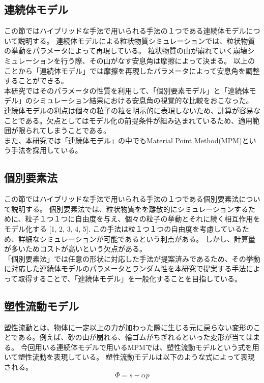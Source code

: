 \documentclass[12pt]{ltjsarticle}
\begin{document}
\subsection{連続体モデル}
この節ではハイブリッドな手法で用いられる手法の１つである連続体モデルについて説明する。
連続体モデルによる粒状物質シミュレーションでは、粒状物質の挙動をパラメータによって再現している。
粒状物質の山が崩れていく崩壊シミュレーションを行う際、その山がなす安息角は摩擦によって決まる。
以上のことから「連続体モデル」では摩擦を再現したパラメータによって安息角を調整することができる。\\
本研究ではそのパラメータの性質を利用して、「個別要素モデル」と「連続体モデル」のシミュレーション結果における安息角の視覚的な比較をおこなった。
連続体モデルの利点は個々の粒子の粒を明示的に表現しないため、計算が容易なことである。欠点としてはモデル化の前提条件が組み込まれているため、適用範囲が限られてしまうことである。\\
また、本研究では「連続体モデル」の中でもMaterial Point Method(MPM)という手法を採用している。

\subsection{個別要素法}
この節ではハイブリッドな手法で用いられる手法の１つである個別要素法について説明する。
個別要素法では、粒状物質をを離散的にシミュレーションするために、粒子１つ１つに自由度を与え、個々の粒子の挙動とそれに続く相互作用をモデル化する [1, 2, 3, 4, 5].
この手法は粒１つ１つの自由度を考慮しているため、詳細なシミュレーションが可能であるという利点がある。
しかし、計算量が多いためコストが高いという欠点がある。\\
「個別要素法」では任意の形状に対応した手法が提案済みであるため、その挙動に対応した連続体モデルのパラメータとランダム性を本研究で提案する手法によって取得することで、「連続体モデル」を一般化することを目指している。




\subsection{塑性流動モデル}
塑性流動とは、物体に一定以上の力が加わった際に生じる元に戻らない変形のことである。例えば、砂の山が崩れる、輪ゴムがちぎれるといった変形が当てはまる。
今回用いる連続体モデルで用いるMPMでは、塑性流動モデルという式を用いて塑性流動を表現している。
塑性流動モデルは以下のような式によって表現される。
\begin{equation}
  \Phi=s-\alpha p
\end{equation}
\end{document}
